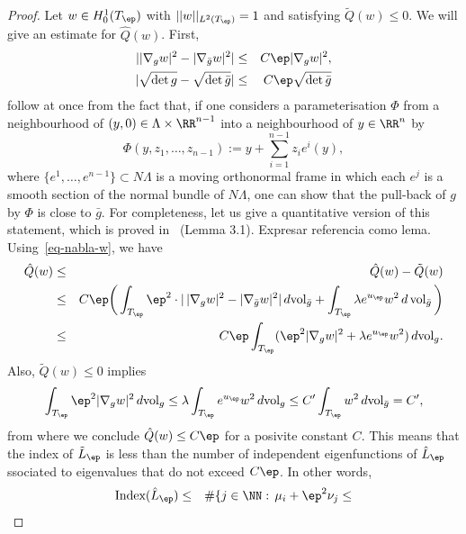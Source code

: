 \begin{proof} Let $w\in H_0^1(T_\ep)$ with $||w||_{L^2(T_\ep)}=1$ and
    satisfying $\tilde Q(w)\leq 0$. We will give an estimate for $\hat Q(w)$.
    First,
    \begin{eqnarray}
        \label{eq-nabla-w}
        ||\nabla_g w|^2-|\nabla_{\bar g} w|^2|&\leq& C\ep |\nabla_g w|^2,\\
        |\sqrt{\det g} - \sqrt{\det \bar g}|&\leq& C\ep\sqrt{\det \bar g}
    \end{eqnarray}
    follow at once from the fact that, if one considers a parameterisation $\Phi$
    from a neighbourhood of $(y,0)\in \Lambda\times \RR^{n-1}$ into a
    neighbourhood of $y\in\RR^n$ by
    \[
        \Phi(y,z_1,\dots,z_{n-1}):=y + \sum_{i=1}^{n-1}z_i e^i(y),
    \]
    where $\{e^1,\dots, e^{n-1}\}\subset N\Lambda$ is a moving orthonormal
    frame in which each $e^j$ is a smooth section of the normal bundle of
    $N\Lambda$, one can show that the pull-back of $g$ by $\Phi$ is close
    to $\bar g$. For completeness, let us give a quantitative version of this
    statement, which is proved in~\cite{Pacard2014} (Lemma 3.1). {\color{red}
    Expresar referencia como lema.} Using~\ref{eq-nabla-w}, we have
    \begin{eqnarray*}
        \hat Q(w) &\leq & \hat Q(w)-\tilde Q(w)\\
                  &\leq & C\ep\bigg(\int_{T_\ep} \ep^2 \cdot |\, |\nabla_g
                      w|^2-|\nabla_{\bar g} w|^2|\, d\mbox{vol}_{\bar g}
                      + \int_{T_\ep} \lambda e^{u_\ep}w^2\,
                  d\operatorname{vol}_{\bar g}\bigg)\\
                  &\leq & C\ep\int_{T_\ep}(\ep^2|\nabla_g w|^2+\lambda
                  e^{u_\ep}w^2) \, d\mbox{vol}_g.
    \end{eqnarray*}
    Also, $\tilde Q(w)\leq 0$ implies
    \begin{equation}
        \int_{T_{\ep}} \ep^2|\nabla_g w|^2\, d\mbox{vol}_g \leq \lambda
        \int_{T_\ep}e^{u_\ep}w^2\, d\mbox{vol}_g \leq C'\int_{T_\ep}w^2\,
        d\mbox{vol}_{\bar g}=C',
    \end{equation}
    from where we conclude $\hat Q(w)\leq C\ep$ for a posivite constant $C$.
    This means that the index of $\tilde L_\ep$ is less than the number of
    independent eigenfunctions of $\hat L_\ep$ ssociated to eigenvalues that
    do not exceed $C\ep$. In other words,
    \begin{eqnarray*}
        \mbox{Index}(\hat L_\ep) &\leq & \#\{j\in\NN:\, \mu_i+\ep^2\nu_j\leq

\end{eqnarray*}
\end{proof}
